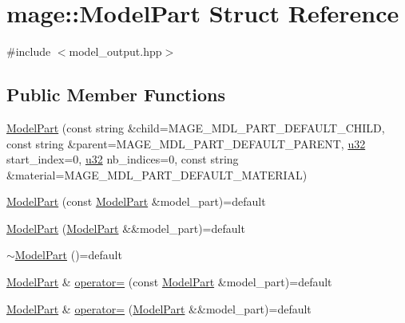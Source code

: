\hypertarget{structmage_1_1_model_part}{}\section{mage\+:\+:Model\+Part Struct Reference}
\label{structmage_1_1_model_part}


{\ttfamily \#include $<$model\+\_\+output.\+hpp$>$}

\subsection*{Public Member Functions}
\begin{DoxyCompactItemize}
\item 
\hyperlink{structmage_1_1_model_part_ab372a2c3f852ccc795a4d55bc81abf8d}{Model\+Part} (const string \&child=M\+A\+G\+E\+\_\+\+M\+D\+L\+\_\+\+P\+A\+R\+T\+\_\+\+D\+E\+F\+A\+U\+L\+T\+\_\+\+C\+H\+I\+LD, const string \&parent=M\+A\+G\+E\+\_\+\+M\+D\+L\+\_\+\+P\+A\+R\+T\+\_\+\+D\+E\+F\+A\+U\+L\+T\+\_\+\+P\+A\+R\+E\+NT, \hyperlink{namespacemage_af2b398bf98eb10351f49cad73fe2cc73}{u32} start\+\_\+index=0, \hyperlink{namespacemage_af2b398bf98eb10351f49cad73fe2cc73}{u32} nb\+\_\+indices=0, const string \&material=M\+A\+G\+E\+\_\+\+M\+D\+L\+\_\+\+P\+A\+R\+T\+\_\+\+D\+E\+F\+A\+U\+L\+T\+\_\+\+M\+A\+T\+E\+R\+I\+AL)
\item 
\hyperlink{structmage_1_1_model_part_a3c39c2c312f07687f8ad5c2c2580d1e2}{Model\+Part} (const \hyperlink{structmage_1_1_model_part}{Model\+Part} \&model\+\_\+part)=default
\item 
\hyperlink{structmage_1_1_model_part_af8744793e9e6eccd59211c87ffc8e745}{Model\+Part} (\hyperlink{structmage_1_1_model_part}{Model\+Part} \&\&model\+\_\+part)=default
\item 
\hyperlink{structmage_1_1_model_part_a3322c5c7924ec30be170ae1ed6dca550}{$\sim$\+Model\+Part} ()=default
\item 
\hyperlink{structmage_1_1_model_part}{Model\+Part} \& \hyperlink{structmage_1_1_model_part_a37e9d66b701ed84111160bf5a003b658}{operator=} (const \hyperlink{structmage_1_1_model_part}{Model\+Part} \&model\+\_\+part)=default
\item 
\hyperlink{structmage_1_1_model_part}{Model\+Part} \& \hyperlink{structmage_1_1_model_part_a8337b8034d9a43514690a2db3d0f43c7}{operator=} (\hyperlink{structmage_1_1_model_part}{Model\+Part} \&\&model\+\_\+part)=default
\end{DoxyCompactItemize}
